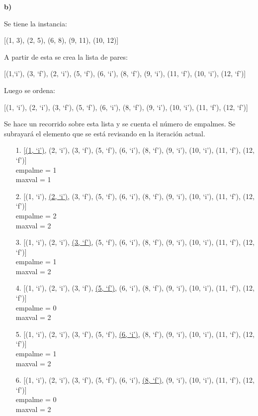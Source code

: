 \documentclass{article}
\begin{document}
\textbf{b)}

Se tiene la instancia:

[(1, 3), (2, 5), (6, 8), (9, 11), (10, 12)]

A partir de esta se crea la lista de pares:

[(1,`i'), (3, `f'), (2, `i'), (5, `f'), (6, `i'), (8, `f'), (9, `i'), (11, `f'), (10, `i'), (12, `f')]

Luego se ordena:

[(1, `i'), (2, `i'), (3, `f'), (5, `f'), (6, `i'), (8, `f'), (9, `i'), (10, `i'), (11, `f'), (12, `f')]

Se hace un recorrido sobre esta lista y se cuenta el número de empalmes. Se subrayará el elemento que se está revisando en la iteración actual.

\begin{itemize}
\item[1.] [\underline{(1, `i')}, (2, `i'), (3, `f'), (5, `f'), (6, `i'), (8, `f'), (9, `i'), (10, `i'), (11, `f'), (12, `f')]\\
empalme = 1\\
maxval = 1

\item[2.] [(1, `i'), \underline{(2, `i')}, (3, `f'), (5, `f'), (6, `i'), (8, `f'), (9, `i'), (10, `i'), (11, `f'), (12, `f')]\\
empalme = 2\\
maxval = 2

\item[3.] [(1, `i'), (2, `i'), \underline{(3, `f')}, (5, `f'), (6, `i'), (8, `f'), (9, `i'), (10, `i'), (11, `f'), (12, `f')]\\
empalme = 1\\
maxval = 2

\item[4.] [(1, `i'), (2, `i'), (3, `f'), \underline{(5, `f')}, (6, `i'), (8, `f'), (9, `i'), (10, `i'), (11, `f'), (12, `f')]\\
empalme = 0\\
maxval = 2

\item[5.] [(1, `i'), (2, `i'), (3, `f'), (5, `f'), \underline{(6, `i')}, (8, `f'), (9, `i'), (10, `i'), (11, `f'), (12, `f')]\\
empalme = 1\\
maxval = 2

\item[6.] [(1, `i'), (2, `i'), (3, `f'), (5, `f'), (6, `i'), \underline{(8, `f')}, (9, `i'), (10, `i'), (11, `f'), (12, `f')]\\
empalme = 0\\
maxval = 2


\end{itemize}
\end{document}
